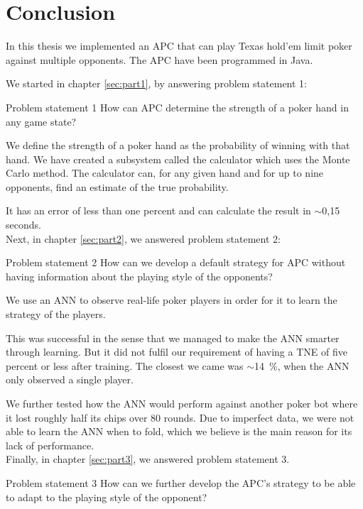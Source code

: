 \section{Conclusion}
In this thesis we implemented an APC that can play Texas hold'em limit poker against multiple opponents. The APC have been programmed in Java.

We started in chapter \ref{sec:part1}, by answering problem statement 1:
\vspace{4mm}
\begin{statementBox2}{Problem statement 1}
How can APC determine the strength of a poker hand in any game state?
\end{statementBox2}
\vspace{4mm}

We define the strength of a poker hand as the probability of winning with that hand.
We have created a subsystem called the calculator which uses the Monte Carlo method. The calculator can, for any given hand and for up to nine opponents, find an estimate of the true probability. 

It has an error of less than one percent and can calculate the result in $\sim$0,15 seconds.\\

Next, in chapter \ref{sec:part2}, we answered problem statement 2:
\vspace{4mm}
\begin{statementBox2}{Problem statement 2}
How can we develop a default strategy for APC without having information about the playing style of the opponents?
\end{statementBox2}
\vspace{4mm}

We use an ANN to observe real-life poker players in order for it to learn the strategy of the players. 

This was successful in the sense that we managed to make the ANN smarter through learning. But it did not fulfil our requirement of having a TNE of five percent or less after training. The closest we came was $\sim$14~\%, when the ANN only observed a single player. 

We further tested how the ANN would perform against another poker bot where it lost roughly half its chips over 80 rounds. Due to imperfect data, we were not able to learn the ANN when to fold, which we believe is the main reason for its lack of performance.\\

Finally, in chapter \ref{sec:part3}, we answered problem statement 3.
\vspace{4mm}
\begin{statementBox2}{Problem statement 3}
How can we further develop the APC's strategy to be able to adapt to the playing style of the opponent?
\end{statementBox2}
\vspace{4mm}

